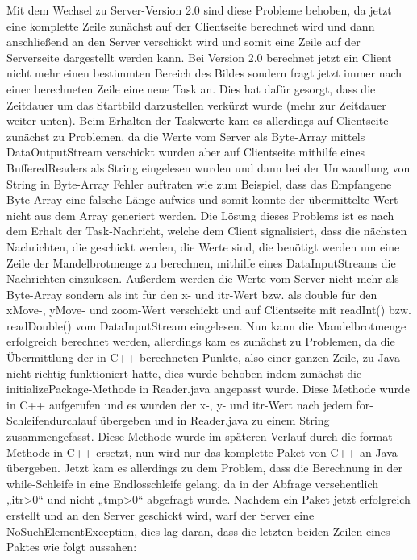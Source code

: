 \documentclass[12pt, onecolumn,notitlepage]{scrartcl}
\begin{document}
Mit dem Wechsel zu Server-Version 2.0 sind diese Probleme behoben, da jetzt eine komplette Zeile zunächst auf der Clientseite berechnet wird und dann anschließend an den Server verschickt wird und somit eine Zeile auf der Serverseite dargestellt werden kann. Bei Version 2.0 berechnet jetzt ein Client nicht mehr einen bestimmten Bereich des Bildes sondern fragt jetzt immer nach einer berechneten Zeile eine neue Task an. Dies hat dafür gesorgt, dass die Zeitdauer um das Startbild darzustellen verkürzt wurde (mehr zur Zeitdauer weiter unten). Beim Erhalten der Taskwerte kam es allerdings auf Clientseite zunächst zu Problemen, da die Werte vom Server als Byte-Array mittels DataOutputStream verschickt wurden aber auf Clientseite mithilfe eines BufferedReaders als String eingelesen wurden und dann bei der Umwandlung von String in Byte-Array Fehler auftraten wie zum Beispiel, dass das Empfangene Byte-Array eine falsche Länge aufwies und somit konnte der übermittelte Wert nicht aus dem Array generiert werden. Die Lösung dieses Problems ist es nach dem Erhalt der Task-Nachricht, welche dem Client signalisiert, dass die nächsten Nachrichten, die geschickt werden, die Werte sind, die benötigt werden um eine Zeile der Mandelbrotmenge zu berechnen, mithilfe eines DataInputStreams die Nachrichten einzulesen. Außerdem werden die Werte vom Server nicht mehr als Byte-Array sondern als int für den x- und itr-Wert bzw. als double für den xMove-, yMove- und zoom-Wert verschickt und auf Clientseite mit readInt() bzw. readDouble() vom DataInputStream eingelesen. Nun kann die Mandelbrotmenge erfolgreich berechnet werden, allerdings kam es zunächst zu Problemen, da die Übermittlung der in C++ berechneten Punkte, also einer ganzen Zeile, zu Java nicht richtig funktioniert hatte, dies wurde behoben indem zunächst die initializePackage-Methode in Reader.java angepasst wurde. Diese Methode wurde in C++ aufgerufen und es wurden der x-, y- und itr-Wert nach jedem for-Schleifendurchlauf übergeben und in Reader.java zu einem String zusammengefasst. Diese Methode wurde im späteren Verlauf durch die format-Methode in C++ ersetzt, nun wird nur das komplette Paket von C++ an Java übergeben. Jetzt kam es allerdings zu dem Problem, dass die Berechnung in der while-Schleife in eine Endlosschleife gelang, da in der Abfrage versehentlich „itr>0“ und nicht „tmp>0“ abgefragt wurde. Nachdem ein Paket jetzt erfolgreich erstellt und an den Server geschickt wird, warf der Server eine NoSuchElementException, dies lag daran, dass die letzten beiden Zeilen eines Paktes wie folgt aussahen: \\
\end{document}
